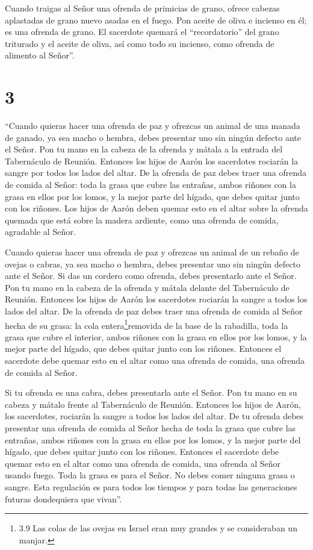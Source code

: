  Cuando traigas al Señor una ofrenda de primicias de grano,
ofrece cabezas aplastadas de grano nuevo asadas en el fuego.
 Pon aceite de oliva e incienso en él; es una ofrenda de
grano.  El sacerdote quemará el ``recordatorio'' del grano
triturado y el aceite de oliva, así como todo su incienso, como ofrenda
de alimento al Señor''.

\hypertarget{section-2}{%
\section{3}\label{section-2}}

 ``Cuando quieras hacer una ofrenda de paz y ofrezcas un
animal de una manada de ganado, ya sea macho o hembra, debes presentar
uno sin ningún defecto ante el Señor.  Pon tu mano en la
cabeza de la ofrenda y mátala a la entrada del Tabernáculo de Reunión.
Entonces los hijos de Aarón los sacerdotes rociarán la sangre por todos
los lados del altar.  De la ofrenda de paz debes traer una
ofrenda de comida al Señor: toda la grasa que cubre las entrañas,
 ambos riñones con la grasa en ellos por los lomos, y la
mejor parte del hígado, que debes quitar junto con los riñones.
 Los hijos de Aarón deben quemar esto en el altar sobre la
ofrenda quemada que está sobre la madera ardiente, como una ofrenda de
comida, agradable al Señor.

 Cuando quieras hacer una ofrenda de paz y ofrezcas un
animal de un rebaño de ovejas o cabras, ya sea macho o hembra, debes
presentar uno sin ningún defecto ante el Señor.  Si das un
cordero como ofrenda, debes presentarlo ante el Señor.  Pon
tu mano en la cabeza de la ofrenda y mátala delante del Tabernáculo de
Reunión. Entonces los hijos de Aarón los sacerdotes rociarán la sangre a
todos los lados del altar.  De la ofrenda de paz debes traer
una ofrenda de comida al Señor hecha de su grasa: la cola
entera\footnote{3.9 Las colas de las ovejas en Israel eran muy grandes y
  se consideraban un manjar.}removida de la base de la rabadilla, toda
la grasa que cubre el interior,  ambos riñones con la grasa
en ellos por los lomos, y la mejor parte del hígado, que debes quitar
junto con los riñones.  Entonces el sacerdote debe quemar
esto en el altar como una ofrenda de comida, una ofrenda de comida al
Señor.

 Si tu ofrenda es una cabra, debes presentarla ante el
Señor.  Pon tu mano en su cabeza y mátalo frente al
Tabernáculo de Reunión. Entonces los hijos de Aarón, los sacerdotes,
rociarán la sangre a todos los lados del altar.  De tu
ofrenda debes presentar una ofrenda de comida al Señor hecha de toda la
grasa que cubre las entrañas,  ambos riñones con la grasa
en ellos por los lomos, y la mejor parte del hígado, que debes quitar
junto con los riñones.  Entonces el sacerdote debe quemar
esto en el altar como una ofrenda de comida, una ofrenda al Señor usando
fuego. Toda la grasa es para el Señor.  No debes comer
ninguna grasa o sangre. Esta regulación es para todos los tiempos y para
todas las generaciones futuras dondequiera que vivan''.


